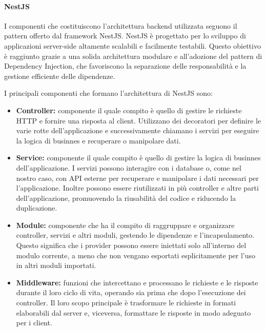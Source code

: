 \paragraph{NestJS}
I componenti che costituiscono l’architettura backend utilizzata seguono il pattern offerto dal framework NestJS.
NestJS è progettato per lo sviluppo di applicazioni server-side altamente scalabili e facilmente testabili.
Questo obiettivo è raggiunto grazie a una solida architettura modulare e all'adozione del pattern di Dependency Injection,
che favoriscono la separazione delle responsabilità e la gestione efficiente delle dipendenze.

I principali componenti che formano l'architettura di NestJS sono:
\begin{itemize}
    \item \textbf{Controller:} componente il quale compito è quello di gestire le richieste HTTP e fornire una risposta al client.
    Utilizzano dei decoratori per definire le varie rotte dell'applicazione e successivamente chiamano i servizi per eseguire la logica di businnes e recuperare o manipolare dati.
    \item \textbf{Service:} componente il quale compito è quello di gestire la logica di businnes dell'applicazione.
    I servizi possono interagire con i database o, come nel nostro caso, con API esterne per recuperare e manipolare i dati necessari per l'applicazione.
    Inoltre possono essere riutilizzati in più controller e altre parti dell'applicazione, promuovendo la riusabilità del codice e riducendo la duplicazione.
    \item \textbf{Module:} componente che ha il compito di raggruppare e organizzare controller, servizi e altri moduli, gestendo le dipendenze e l'incapsulamento.
    Questo significa che i provider possono essere iniettati solo all'interno del modulo corrente, a meno che non vengano esportati esplicitamente per l'uso in altri moduli importati.
    \item \textbf{Middleware:} funzioni che intercettano e processano le richieste e le risposte durante il loro ciclo di vita, operando sia prima che dopo l'esecuzione dei controller.
    Il loro scopo principale è trasformare le richieste in formati elaborabili dal server e, viceversa, formattare le risposte in modo adeguato per i client.
\end{itemize}


